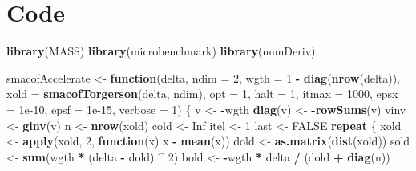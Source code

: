 \documentclass[
  12pt,
]{article}
\newenvironment{Shaded}{\begin{snugshade}}{\end{snugshade}}
\newcommand{\AttributeTok}[1]{\textcolor[rgb]{0.13,0.29,0.53}{#1}}
\newcommand{\ConstantTok}[1]{\textcolor[rgb]{0.56,0.35,0.01}{#1}}
\newcommand{\ControlFlowTok}[1]{\textcolor[rgb]{0.13,0.29,0.53}{\textbf{#1}}}
\newcommand{\DecValTok}[1]{\textcolor[rgb]{0.00,0.00,0.81}{#1}}
\newcommand{\FloatTok}[1]{\textcolor[rgb]{0.00,0.00,0.81}{#1}}
\newcommand{\FunctionTok}[1]{\textcolor[rgb]{0.13,0.29,0.53}{\textbf{#1}}}
\newcommand{\NormalTok}[1]{#1}
\newcommand{\OtherTok}[1]{\textcolor[rgb]{0.56,0.35,0.01}{#1}}
\newcommand{\SpecialCharTok}[1]{\textcolor[rgb]{0.81,0.36,0.00}{\textbf{#1}}}
\begin{document}
\section{Code}\label{code}

\begin{Shaded}
\begin{Highlighting}[]
\FunctionTok{library}\NormalTok{(MASS)}
\FunctionTok{library}\NormalTok{(microbenchmark)}
\FunctionTok{library}\NormalTok{(numDeriv)}

\NormalTok{smacofAccelerate }\OtherTok{\textless{}{-}} \ControlFlowTok{function}\NormalTok{(delta,}
                             \AttributeTok{ndim =} \DecValTok{2}\NormalTok{,}
                             \AttributeTok{wgth =} \DecValTok{1} \SpecialCharTok{{-}} \FunctionTok{diag}\NormalTok{(}\FunctionTok{nrow}\NormalTok{(delta)),}
                             \AttributeTok{xold =} \FunctionTok{smacofTorgerson}\NormalTok{(delta, ndim),}
                             \AttributeTok{opt =} \DecValTok{1}\NormalTok{,}
                             \AttributeTok{halt =} \DecValTok{1}\NormalTok{,}
                             \AttributeTok{itmax =} \DecValTok{1000}\NormalTok{,}
                             \AttributeTok{epsx =} \FloatTok{1e{-}10}\NormalTok{,}
                             \AttributeTok{epsf =} \FloatTok{1e{-}15}\NormalTok{,}
                             \AttributeTok{verbose =} \DecValTok{1}\NormalTok{) \{}
\NormalTok{  v }\OtherTok{\textless{}{-}} \SpecialCharTok{{-}}\NormalTok{wgth}
  \FunctionTok{diag}\NormalTok{(v) }\OtherTok{\textless{}{-}} \SpecialCharTok{{-}}\FunctionTok{rowSums}\NormalTok{(v)}
\NormalTok{  vinv }\OtherTok{\textless{}{-}} \FunctionTok{ginv}\NormalTok{(v)}
\NormalTok{  n }\OtherTok{\textless{}{-}} \FunctionTok{nrow}\NormalTok{(xold)}
\NormalTok{  cold }\OtherTok{\textless{}{-}} \ConstantTok{Inf}
\NormalTok{  itel }\OtherTok{\textless{}{-}} \DecValTok{1}
\NormalTok{  last }\OtherTok{\textless{}{-}} \ConstantTok{FALSE}
  \ControlFlowTok{repeat}\NormalTok{ \{}
\NormalTok{    xold }\OtherTok{\textless{}{-}} \FunctionTok{apply}\NormalTok{(xold, }\DecValTok{2}\NormalTok{, }\ControlFlowTok{function}\NormalTok{(x)}
\NormalTok{      x }\SpecialCharTok{{-}} \FunctionTok{mean}\NormalTok{(x))}
\NormalTok{    dold }\OtherTok{\textless{}{-}} \FunctionTok{as.matrix}\NormalTok{(}\FunctionTok{dist}\NormalTok{(xold))}
\NormalTok{    sold }\OtherTok{\textless{}{-}} \FunctionTok{sum}\NormalTok{(wgth }\SpecialCharTok{*}\NormalTok{ (delta }\SpecialCharTok{{-}}\NormalTok{ dold) }\SpecialCharTok{\^{}} \DecValTok{2}\NormalTok{)}
\NormalTok{    bold }\OtherTok{\textless{}{-}} \SpecialCharTok{{-}}\NormalTok{wgth }\SpecialCharTok{*}\NormalTok{ delta }\SpecialCharTok{/}\NormalTok{ (dold }\SpecialCharTok{+} \FunctionTok{diag}\NormalTok{(n))}

\end{Highlighting}
\end{Shaded}
\end{document}
